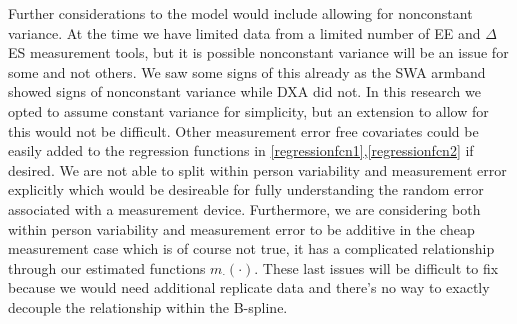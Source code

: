 \documentclass[11pt]{article}\usepackage[]{graphicx}\usepackage[]{color}
\begin{document}
Further considerations to the model would include allowing for nonconstant variance. At the time we have limited data from a limited number of EE and $\Delta$ES measurement tools, but it is possible nonconstant variance will be an issue for some and not others. We saw some signs of this already as the SWA armband showed signs of nonconstant variance while DXA did not. In this research we opted to assume constant variance for simplicity, but an extension to allow for this would not be difficult. Other measurement error free covariates could be easily added to the regression functions in \eqref{regressionfcn1},\eqref{regressionfcn2} if desired. 
We are not able to split within person variability and measurement error explicitly which would be desireable for fully understanding the random error associated with a measurement device. Furthermore, we are considering both within person variability and measurement error to be additive in the cheap measurement case which is of course not true, it has a complicated relationship through our estimated functions $m_{\cdot}(\cdot)$. These last issues will be difficult to fix because we would need additional replicate data and there's no way to exactly decouple the relationship within the B-spline.


\clearpage
\end{document}
